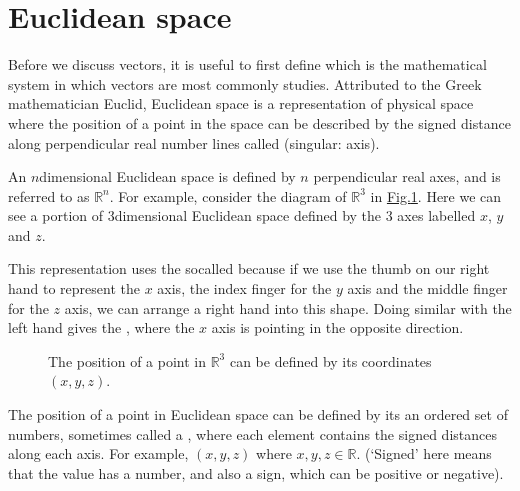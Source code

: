 \documentclass[letterpaper,10pt,english]{jupyterBook}
\let\sphinxpxdimen\pdfpxdimen\else\newdimen\sphinxpxdimen
\begin{document}
\section{Euclidean space}
\label{\detokenize{_pages/3.0_Vectors:euclidean-space}}\label{\detokenize{_pages/3.0_Vectors:index-1}}\label{\detokenize{_pages/3.0_Vectors:euclidean-space-section}}
\sphinxAtStartPar
Before we discuss vectors, it is useful to first define  which is the mathematical system in which vectors are most commonly studies. Attributed to the Greek mathematician Euclid, Euclidean space is a representation of physical space where the position of a point in the space can be described by the signed distance along perpendicular real number lines called  (singular: axis).

\sphinxAtStartPar
An \(n\)\sphinxhyphen{}dimensional Euclidean space is defined by \(n\) perpendicular real axes, and is referred to as \(\mathbb{R}^n\). For example, consider the diagram of \(\mathbb{R}^3\) in \hyperref[\detokenize{_pages/3.0_Vectors:r3-figure}]{Fig.\@ \ref{\detokenize{_pages/3.0_Vectors:r3-figure}}}. Here we can see a portion of 3\sphinxhyphen{}dimensional Euclidean space defined by the 3 axes labelled \(x\), \(y\) and \(z\).

\sphinxAtStartPar
This representation uses the  so\sphinxhyphen{}called because if we use the thumb on our right hand to represent the \(x\) axis, the index finger for the \(y\) axis and the middle finger for the \(z\) axis, we can arrange a right hand into this shape. Doing similar with the left hand gives the , where the \(x\) axis is pointing in the opposite direction.

\begin{figure}[htbp]
\centering
\capstart

\noindent\sphinxincludegraphics[width=300\sphinxpxdimen]{{3_R3}.svg}
\caption{The position of a point in \(\mathbb{R}^3\) can be defined by its co\sphinxhyphen{}ordinates \((x, y, z)\).}\label{\detokenize{_pages/3.0_Vectors:r3-figure}}\end{figure}

\ignorespaces 
{}\ignorespaces 
\sphinxAtStartPar
The position of a point in Euclidean space can be defined by its  \sphinxhyphen{} an ordered set of numbers, sometimes called a , where each element contains the signed distances along each axis. For example, \((x, y, z)\) where \(x, y, z \in \mathbb{R}\). (‘Signed’ here means that the value has a number, and also a sign, which can be positive or negative).
\end{document}
